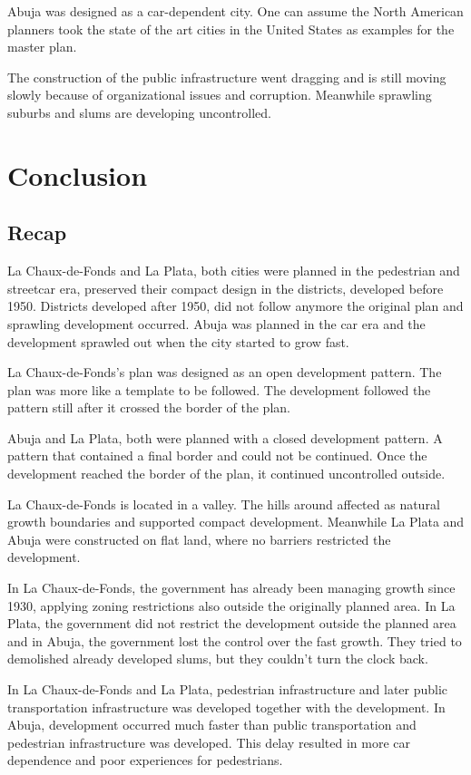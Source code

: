 \documentclass{article}
\begin{document}
\begin{multicols}{2}
			Abuja was designed as a car-dependent city. One can assume the North American planners took the state of the art cities in the United States as examples for the master plan.
			
			The construction of the public infrastructure went dragging and is still moving slowly because of organizational issues and corruption. Meanwhile sprawling suburbs and slums are developing uncontrolled.
			

	\clearpage
	\section{Conclusion}	
		\subsection{Recap}
	
		La Chaux-de-Fonds and La Plata, both cities were planned in the pedestrian and streetcar era, preserved their compact design in the districts, developed before 1950. Districts developed after 1950, did not follow anymore the original plan and sprawling development occurred.
		Abuja was planned in the car era and the development sprawled out when the city started to grow fast.
	
		La Chaux-de-Fonds's plan was designed as an open development pattern. The plan was more like a template to be followed. The development followed the pattern still after it crossed the border of the plan.
	
		Abuja and La Plata, both were planned with a closed development pattern. A pattern that contained a final border and could not be continued. Once the development reached the border of the plan, it continued uncontrolled outside.
	
		La Chaux-de-Fonds is located in a valley. The hills around affected as natural growth boundaries and supported compact development. Meanwhile La Plata and Abuja were constructed on flat land, where no barriers restricted the development.
	
		In La Chaux-de-Fonds, the government has already been managing growth since 1930, applying zoning restrictions also outside the originally planned area. In La Plata, the government did not restrict the development outside the planned area and in Abuja, the government lost the control over the fast growth. They tried to demolished already developed slums, but they couldn't turn the clock back.

		In La Chaux-de-Fonds and La Plata, pedestrian infrastructure and later public transportation infrastructure was developed together with the development. In Abuja, development occurred much faster than public transportation and pedestrian infrastructure was developed. This delay resulted in more car dependence and poor experiences for pedestrians.



\end{multicols}
\end{document}
